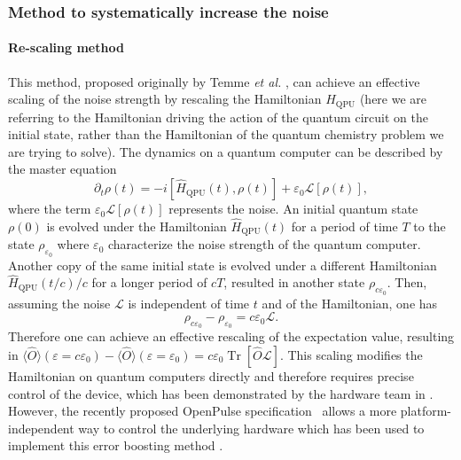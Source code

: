 \subsubsection{Method to systematically increase the noise}\label{sec:mit-increase_noise}

\paragraph{Re-scaling method}
This method, proposed originally by Temme \textit{et al.} \cite{temmeErrorMitigationShortDepth2017}, can achieve an effective scaling of the noise strength by rescaling the Hamiltonian $H_{\mathrm{QPU}}$ (here we are referring to the Hamiltonian driving the action of the quantum circuit on the initial state, rather than the Hamiltonian of the quantum chemistry problem we are trying to solve). The dynamics on a quantum computer
can be described by the master equation
\begin{equation}
    \partial _{t} \rho (t)=-i[\hat{H}_{\mathrm{QPU}}(t),\rho (t)]+\varepsilon _{0}\mathcal{L} [\rho (t)],
\end{equation}
where the term $\varepsilon _{0}\mathcal{L} [\rho (t)]$ represents the noise. An initial quantum state $\rho(0)$ is evolved under
the Hamiltonian $\hat{H}_{\mathrm{QPU}}(t)$ for a period of time $T$ to the state $\rho_{\varepsilon_0}$ where $\varepsilon_0$ characterize the noise strength of the quantum computer. Another copy of the same initial state is evolved under a different Hamiltonian $\hat{H}_{\mathrm{QPU}}(t/c)/c$ for a longer period of $cT$, resulted in another state $\rho_{c\varepsilon_0}$. Then, assuming the noise $\mathcal{L}$ is independent of time $t$ and of the Hamiltonian, one has
\begin{equation}
    \rho _{c\varepsilon_0} -\rho _{\varepsilon_0} =c \varepsilon _{0}\mathcal{L}.
\end{equation}
Therefore one can achieve an effective rescaling of the expectation value, resulting in $ \langle \hat{O} \rangle (\varepsilon=c \varepsilon _{0} )- \langle \hat{O} \rangle (\varepsilon=\varepsilon_0)=c \varepsilon _{0}\operatorname{Tr}[\hat{O}\mathcal{L}]$.
This scaling modifies the Hamiltonian on quantum computers directly and therefore requires precise control of the device, which has been demonstrated by the hardware team in \citet{kandalaErrorMitigationExtends2019}.
However, the recently proposed OpenPulse specification~\cite{mckayQiskitBackendSpecifications2018} allows a more
platform-independent way to control the underlying hardware which
has been used to implement this error boosting method  \cite{garmonBenchmarkingNoiseExtrapolation2020}.


